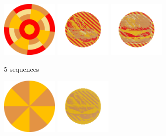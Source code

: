 \documentclass{article}
\begin{document}
\begin{figure}[ht!]

\begin{subfigure}[t]{0.4\textwidth}
\includegraphics[width=0.3\textwidth]{images/reduction/5/disc.png}
\includegraphics[width=0.3\textwidth]{images/reduction/5/sim0.png}
\includegraphics[width=0.3\textwidth]{images/reduction/5/sim1.png}
\caption{5 sequences}
\end{subfigure}
\hfill
\begin{subfigure}[t]{0.4\textwidth}
\includegraphics[width=0.3\textwidth]{images/reduction/1/disc.png}
\includegraphics[width=0.3\textwidth]{images/reduction/1/sim0.png}

\end{subfigure}
\end{figure}
\end{document}
